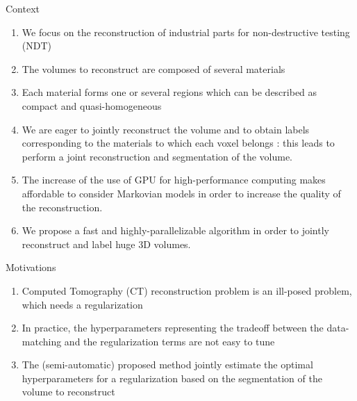 \documentclass[latex]{beamer}
\begin{document}
\begin{frame}{}
\begin{block}{Context}
\begin{enumerate}
\item We focus on the reconstruction of industrial parts for non-destructive testing (NDT)
\item The volumes to reconstruct are composed of several materials
\item Each material forms one or several regions which can be described as compact and quasi-homogeneous
\item We are eager to jointly reconstruct the volume and to obtain labels corresponding to the materials to which each voxel belongs : this leads to perform a joint reconstruction and segmentation of the volume.
\item The increase of the use of GPU for high-performance computing makes affordable to consider Markovian models in order to increase the quality of the reconstruction.
\item We propose a fast and highly-parallelizable algorithm in order to jointly reconstruct and label huge 3D volumes.
\end{enumerate}
\end{block}
\end{frame}

\begin{frame}{}
\begin{block}{Motivations}
\begin{enumerate}
\item Computed Tomography (CT) reconstruction problem is an ill-posed problem, which needs a regularization
\item In practice, the hyperparameters representing the tradeoff between the data-matching and the regularization terms are not easy to tune
\item The (semi-automatic) proposed method jointly estimate the optimal  hyperparameters for a regularization based on the segmentation of the volume to reconstruct
\end{enumerate}
\end{block}
\end{frame}
\end{document}
